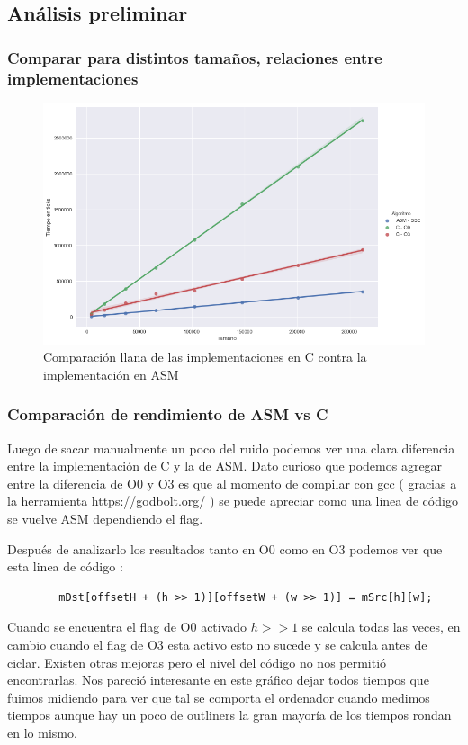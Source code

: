 \subsection{Análisis preliminar}
\subsubsection*{Comparar para distintos tamaños, relaciones entre implementaciones}
\begin{figure}[H]
\centering
\includegraphics[scale=0.5]{img/fourCombine_CvsASMvsO3.png}
\caption{Comparación llana de las implementaciones en C contra la implementación en ASM}
\end{figure}
\subsubsection*{Comparación de rendimiento de ASM vs C}
Luego de sacar manualmente un poco del ruido podemos ver una clara diferencia entre la implementación de C y la de ASM. Dato curioso que podemos agregar entre la diferencia de O0 y O3 es que al momento de compilar con gcc ( gracias a la herramienta \url{https://godbolt.org/} ) se puede apreciar como una linea de código se vuelve ASM dependiendo el flag. 

Después de analizarlo los resultados tanto en O0 como en O3 podemos ver que esta linea de código :

\begin{lstlisting}
		mDst[offsetH + (h >> 1)][offsetW + (w >> 1)] = mSrc[h][w];
\end{lstlisting}

Cuando se encuentra el flag de O0 activado $h >> 1$ se calcula todas las veces, en cambio cuando el flag de O3 esta activo esto no sucede y se calcula antes de ciclar. Existen otras mejoras pero el nivel del código no nos permitió encontrarlas. Nos pareció interesante en este gráfico dejar todos tiempos que fuimos midiendo para ver que tal se comporta el ordenador cuando medimos tiempos aunque hay un poco de outliners la gran mayoría de los tiempos rondan en lo mismo.

